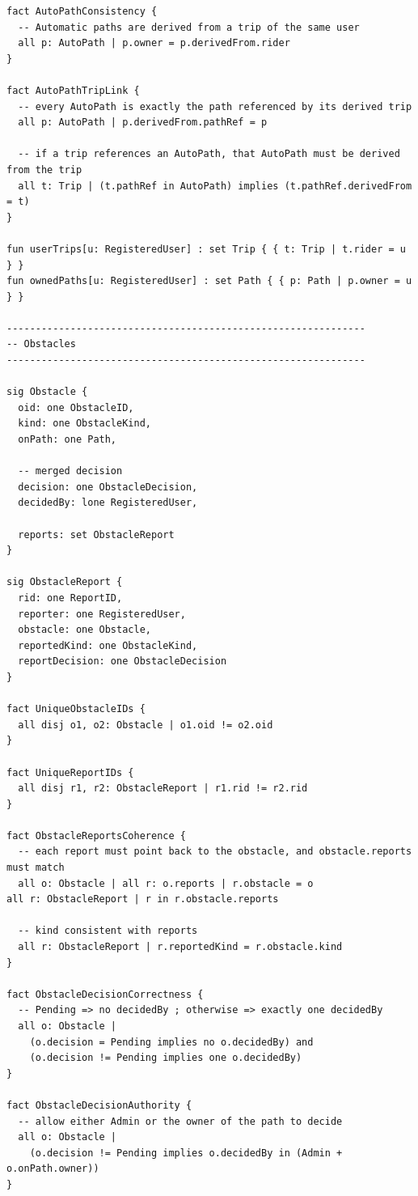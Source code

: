 \begin{lstlisting}
fact AutoPathConsistency {
  -- Automatic paths are derived from a trip of the same user
  all p: AutoPath | p.owner = p.derivedFrom.rider
}

fact AutoPathTripLink {
  -- every AutoPath is exactly the path referenced by its derived trip
  all p: AutoPath | p.derivedFrom.pathRef = p

  -- if a trip references an AutoPath, that AutoPath must be derived from the trip
  all t: Trip | (t.pathRef in AutoPath) implies (t.pathRef.derivedFrom = t)
}

fun userTrips[u: RegisteredUser] : set Trip { { t: Trip | t.rider = u } }
fun ownedPaths[u: RegisteredUser] : set Path { { p: Path | p.owner = u } }

--------------------------------------------------------------
-- Obstacles
--------------------------------------------------------------

sig Obstacle {
  oid: one ObstacleID,
  kind: one ObstacleKind,
  onPath: one Path,

  -- merged decision
  decision: one ObstacleDecision,
  decidedBy: lone RegisteredUser,

  reports: set ObstacleReport
}

sig ObstacleReport {
  rid: one ReportID,
  reporter: one RegisteredUser,
  obstacle: one Obstacle,
  reportedKind: one ObstacleKind,
  reportDecision: one ObstacleDecision
}

fact UniqueObstacleIDs {
  all disj o1, o2: Obstacle | o1.oid != o2.oid
}

fact UniqueReportIDs {
  all disj r1, r2: ObstacleReport | r1.rid != r2.rid
}

fact ObstacleReportsCoherence {
  -- each report must point back to the obstacle, and obstacle.reports must match
  all o: Obstacle | all r: o.reports | r.obstacle = o
all r: ObstacleReport | r in r.obstacle.reports

  -- kind consistent with reports
  all r: ObstacleReport | r.reportedKind = r.obstacle.kind
}

fact ObstacleDecisionCorrectness {
  -- Pending => no decidedBy ; otherwise => exactly one decidedBy
  all o: Obstacle |
    (o.decision = Pending implies no o.decidedBy) and
    (o.decision != Pending implies one o.decidedBy)
}

fact ObstacleDecisionAuthority {
  -- allow either Admin or the owner of the path to decide
  all o: Obstacle |
    (o.decision != Pending implies o.decidedBy in (Admin + o.onPath.owner))
}


\end{lstlisting}

